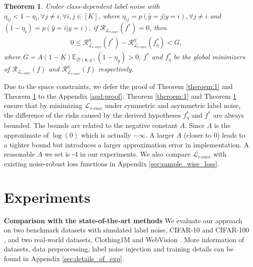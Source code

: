 \documentclass{article}
\newtheorem{theorem}{Theorem}
\begin{document}
\begin{theorem}
	\label{theorem:2}
	Under class-dependent label noise with $\eta_{ij}<1-\eta_{i},\forall j\ne i,\forall i,j \in [K]$, where $\eta_{ij}=p(\hat{y}=j|y=i), \forall j\ne i$ and $(1-\eta_{i}) = p(\hat{y}=i|y=i)$, if $\mathcal{R}_{\mathcal{L}_{r\text{-}cace}}(f^{*})=0$, then
	\begin{align}
		0\le\mathcal{R}_{\mathcal{L}_{r\text{-}cace}}^{\eta}(f^{*}) - \mathcal{R}_{\mathcal{L}_{r\text{-}cace}}^{\eta}(f^{*}_{\eta}) < G, 
	\end{align}
	where $G=A(1-K) \mathbb{E}_{\mathcal{D}(\bm{x},y)}(1-\eta_{y}) >0 $, $f^{*}$ and $f^{*}_{\eta}$ be the global minimizers of $\mathcal{R}_{\mathcal{L}_{r\textrm{-}cace}}(f)$ and $\mathcal{R}^{\eta}_{\mathcal{L}_{r\textrm{-}cace}}(f)$ respectively. 
	
\end{theorem}

Due to the space constraints, we defer the proof of Theorem \ref{theroem:1} and Theorem \ref{theorem:2} to the Appendix \ref{apd:proof}. Theorem \ref{theroem:1} and Theorem \ref{theorem:2} ensure that by minimizing $\mathcal{L}_{r\textrm{-}cace}$ under symmetric and asymmetric label noise, the difference of the risks caused by the derived hypotheses $f^{*}_{\eta}$ and $f^{*}$ are always bounded. The bounds are related to the negative constant $A$. Since $A$ is the approximate of $\log(0)$ which is actually $-\infty$. A larger $A$ (closer to 0) leads to a tighter bound but introduces a larger approximation error in implementation. A reasonable $A$ we set is -4 in our experiments. We also compare $\mathcal{L}_{r\textrm{-}cace}$ with existing noise-robust loss functions in Appendix \ref{sec:sample_wise_loss}. 













\section{Experiments}


\textbf{Comparison with the state-of-the-art methods} We evaluate our approach on two benchmark datasets with simulated label noise, CIFAR-10 and CIFAR-100 \cite{krizhevsky2009learning}, and two real-world datasets, Clothing1M \cite{xiao2015learning} and WebVision \cite{li2017webvision}. More information of datasets, data preprocessing, label noise injection and training details can be found in Appendix \ref{sec:details_of_exp}. 
\end{document}
